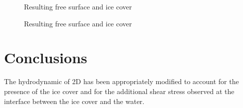 \begin{figure}[H]
    \begin{center}
    \end{center}
    \caption{Resulting free surface and ice cover}
    \label{fig:res-cover_04}
\end{figure}

\begin{figure}[H]
    \begin{center}
    \end{center}
    \caption{Resulting free surface and ice cover}
    \label{fig:res-cover_04_2}
\end{figure}

\section{Conclusions}

The hydrodynamic of \telemac2D has been appropriately modified to account for the presence of the ice cover and for the additional shear stress observed at the interface between the ice cover and the water.


\renewcommand{\labelitemi}{\textbullet}
